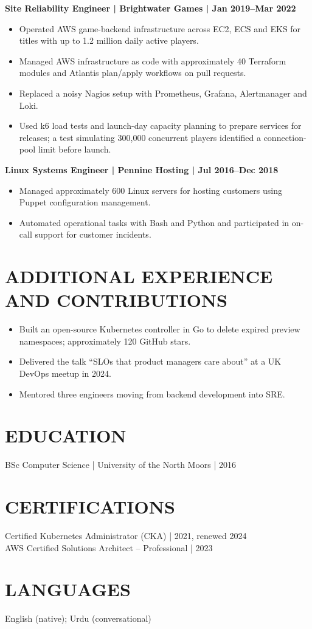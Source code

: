 \documentclass[11pt,a4paper]{article}
\begin{document}
\noindent\textbf{Site Reliability Engineer | Brightwater Games | Jan 2019--Mar 2022}
\begin{itemize}
\item Operated AWS game-backend infrastructure across EC2, ECS and EKS for titles with up to 1.2 million daily active players.
\item Managed AWS infrastructure as code with approximately 40 Terraform modules and Atlantis plan/apply workflows on pull requests.
\item Replaced a noisy Nagios setup with Prometheus, Grafana, Alertmanager and Loki.
\item Used k6 load tests and launch-day capacity planning to prepare services for releases; a test simulating 300,000 concurrent players identified a connection-pool limit before launch.
\end{itemize}

\noindent\textbf{Linux Systems Engineer | Pennine Hosting | Jul 2016--Dec 2018}
\begin{itemize}
\item Managed approximately 600 Linux servers for hosting customers using Puppet configuration management.
\item Automated operational tasks with Bash and Python and participated in on-call support for customer incidents.
\end{itemize}

\section*{ADDITIONAL EXPERIENCE AND CONTRIBUTIONS}
\begin{itemize}
\item Built an open-source Kubernetes controller in Go to delete expired preview namespaces; approximately 120 GitHub stars.
\item Delivered the talk “SLOs that product managers care about” at a UK DevOps meetup in 2024.
\item Mentored three engineers moving from backend development into SRE.
\end{itemize}

\section*{EDUCATION}
BSc Computer Science | University of the North Moors | 2016

\section*{CERTIFICATIONS}
Certified Kubernetes Administrator (CKA) | 2021, renewed 2024\\
AWS Certified Solutions Architect -- Professional | 2023

\section*{LANGUAGES}
English (native); Urdu (conversational)
\end{document}
